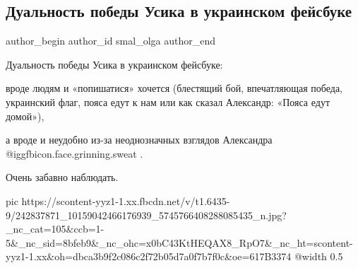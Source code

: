  
 
 
 
 
 
\subsection{Дуальность победы Усика в украинском фейсбуке}
\label{sec:26_09_2021.fb.smal_olga.1.usik_dualnost_pobeda}
 
\ifcmt
 author_begin
   author_id smal_olga
 author_end
\fi

Дуальность победы Усика в украинском фейсбуке: 

вроде людям и «попишатися» хочется (блестящий бой, впечатляющая победа,
украинский флаг, пояса едут к нам или как сказал Александр: «Пояса едут
домой»), 

а вроде и неудобно из-за неоднозначных взглядов Александра @igg{fbicon.face.grinning.sweat} . 

Очень забавно наблюдать.

\ifcmt
  pic https://scontent-yyz1-1.xx.fbcdn.net/v/t1.6435-9/242837871_10159042466176939_5745766408288085435_n.jpg?_nc_cat=105&ccb=1-5&_nc_sid=8bfeb9&_nc_ohc=x0bC43KtHEQAX8_RpO7&_nc_ht=scontent-yyz1-1.xx&oh=dbca3b9f2c086c2f72b05d7a0f7b7f0c&oe=617B3374
  @width 0.5
\fi

